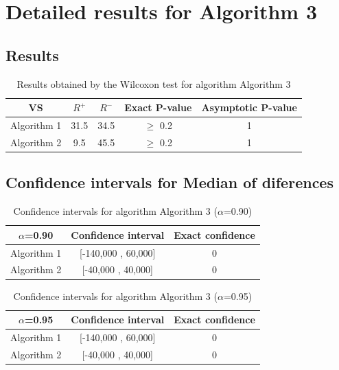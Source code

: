\documentclass[a4paper,10pt]{article}
\begin{document}
 \clearpage 


\section{Detailed results for Algorithm 3}


\subsection{Results}

\begin{table}[!htp]
\centering\small
\begin{tabular}{
|c|c|c|c|c|}
\hline
 VS & $R^{+}$ & $R^{-}$ & Exact P-value & Asymptotic P-value \\ \hline 
Algorithm 1 & 31.5 & 34.5 & $\geq$ 0.2 & 1\\ \hline 
Algorithm 2 & 9.5 & 45.5 & $\geq$ 0.2 & 1\\ \hline 

\end{tabular}
\caption{Results obtained by the Wilcoxon test for algorithm Algorithm 3}
\end{table}

\subsection{Confidence intervals for Median of diferences}

\begin{table}[!htp]
\centering\small
\begin{tabular}{
|c|c|c|}
\hline
 $\alpha$=0.90 & Confidence interval & Exact confidence \\ \hline 
Algorithm 1 & [-140,000 , 60,000] & 0\\ \hline 
Algorithm 2 & [-40,000 , 40,000] & 0\\ \hline 

\end{tabular}
\caption{Confidence intervals for algorithm Algorithm 3 ($\alpha$=0.90)}
\end{table}
\begin{table}[!htp]
\centering\small
\begin{tabular}{
|c|c|c|}
\hline
 $\alpha$=0.95 & Confidence interval & Exact confidence \\ \hline 
Algorithm 1 & [-140,000 , 60,000] & 0\\ \hline 
Algorithm 2 & [-40,000 , 40,000] & 0\\ \hline 

\end{tabular}
\caption{Confidence intervals for algorithm Algorithm 3 ($\alpha$=0.95)}
\end{table}

 \clearpage 
\end{document}
